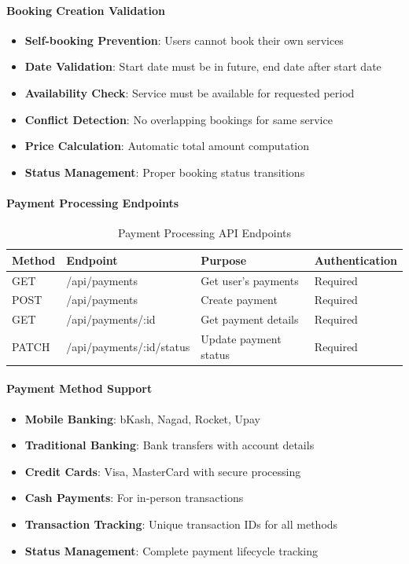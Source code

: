 \documentclass[12pt,a4paper]{article}
\begin{document}
\paragraph{Booking Creation Validation}
\begin{itemize}
\item \textbf{Self-booking Prevention}: Users cannot book their own services
\item \textbf{Date Validation}: Start date must be in future, end date after start date
\item \textbf{Availability Check}: Service must be available for requested period
\item \textbf{Conflict Detection}: No overlapping bookings for same service
\item \textbf{Price Calculation}: Automatic total amount computation
\item \textbf{Status Management}: Proper booking status transitions
\end{itemize}

\paragraph{Payment Processing Endpoints}
\begin{table}[H]
\centering
\small
\begin{tabular}{@{}llll@{}}
\toprule
\textbf{Method} & \textbf{Endpoint} & \textbf{Purpose} & \textbf{Authentication} \\
\midrule
GET & /api/payments & Get user's payments & Required \\
POST & /api/payments & Create payment & Required \\
GET & /api/payments/:id & Get payment details & Required \\
PATCH & /api/payments/:id/status & Update payment status & Required \\
\bottomrule
\end{tabular}
\caption{Payment Processing API Endpoints}
\label{tab:payment-endpoints}
\end{table}

\paragraph{Payment Method Support}
\begin{itemize}
\item \textbf{Mobile Banking}: bKash, Nagad, Rocket, Upay
\item \textbf{Traditional Banking}: Bank transfers with account details
\item \textbf{Credit Cards}: Visa, MasterCard with secure processing
\item \textbf{Cash Payments}: For in-person transactions
\item \textbf{Transaction Tracking}: Unique transaction IDs for all methods
\item \textbf{Status Management}: Complete payment lifecycle tracking
\end{itemize}
\end{document}
